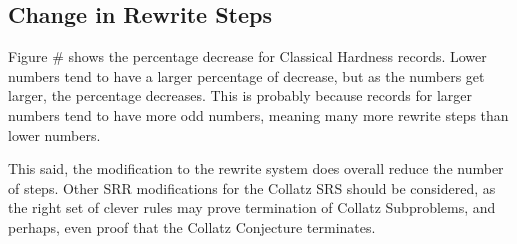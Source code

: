 \subsection{Change in Rewrite Steps}
Figure \# shows the percentage decrease for Classical Hardness records. Lower numbers tend to have a larger percentage of decrease, but as the numbers get larger, the percentage decreases. This is probably because records for larger numbers tend to have more odd numbers, meaning many more rewrite steps than lower numbers. \par
This said, the modification to the rewrite system does overall reduce the number of steps. Other SRR modifications for the Collatz SRS should be considered, as the right set of clever rules may prove termination of Collatz Subproblems, and perhaps, even proof that the Collatz Conjecture terminates.
